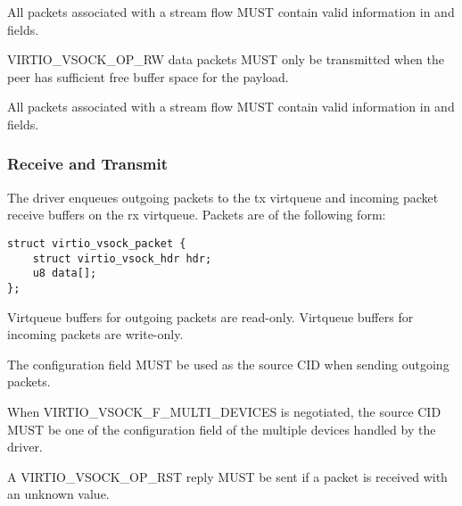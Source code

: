 All packets associated with a stream flow MUST contain valid information in
 and  fields.

VIRTIO_VSOCK_OP_RW data packets MUST only be transmitted when the peer has
sufficient free buffer space for the payload.

All packets associated with a stream flow MUST contain valid information in
 and  fields.

\subsubsection{Receive and Transmit}\label{sec:Device Types / Socket Device / Device Operation / Receive and Transmit}
The driver enqueues outgoing packets to the tx virtqueue and incoming packet
receive buffers on the rx virtqueue. Packets are of the following form:

\begin{lstlisting}
struct virtio_vsock_packet {
    struct virtio_vsock_hdr hdr;
    u8 data[];
};
\end{lstlisting}

Virtqueue buffers for outgoing packets are read-only. Virtqueue buffers for
incoming packets are write-only.


The  configuration field MUST be used as the source CID
when sending outgoing packets.

When VIRTIO_VSOCK_F_MULTI_DEVICES is negotiated, the source CID MUST be one
of the  configuration field of the multiple devices
handled by the driver.

A VIRTIO_VSOCK_OP_RST reply MUST be sent if a packet is received with an
unknown  value.


